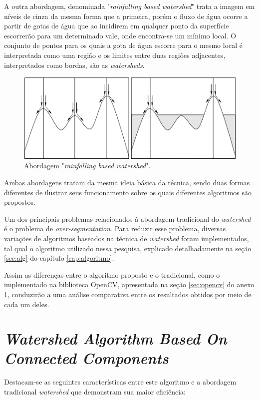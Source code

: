 A outra abordagem, denominada "\textit{rainfalling based watershed}" trata a imagem em níveis de cinza da mesma forma que a primeira, porém o fluxo de água ocorre a partir de gotas de água que ao incidirem em qualquer ponto da superfície escorrerão para um determinado vale, onde encontra-se um mínimo local. O conjunto de pontos para os quais a gota de água escorre para o mesmo local é interpretada como uma região e os limites entre duas regiões adjacentes,  interpretados como bordas, são as \textit{watersheds}. \citep{l6} 

	\begin{figure}[!htb]
       \begin{center}  
          \includegraphics[width=0.6\columnwidth]{img/abordagem_rainfalling.jpg}
           \caption{\label{fig:abordagem_rainfalling}Abordagem "\textit{rainfalling based watershed}". \cite{ruparelia2012implementation}}
       \end{center}
   \end{figure} 
	

Ambas abordagens tratam da mesma ideia básica da técnica, sendo duas formas diferentes de ilustrar seus funcionamento sobre os quais diferentes algoritmos são propostos.

Um dos principais problemas relacionados à abordagem tradicional do \textit{watershed} é o problema de \textit{over-segmentation}. Para reduzir esse problema, diversas variações de algoritmos baseados na técnica de \textit{watershed} foram implementados, tal qual o algoritmo utilizado nessa pesquisa, explicado detalhadamente na seção \ref{sec:alg} do capítulo \ref{cap:algoritmo}. 

Assim as diferenças entre o algoritmo proposto e o tradicional, como o implementado na biblioteca OpenCV, apresentada na seção \ref{sec:opencv} do anexo 1, conduzirão a uma análise comparativa entre os resultados obtidos por meio de cada um deles.

\section{\textit{Watershed Algorithm Based On Connected Components}}
Destacam-se as seguintes características entre este algoritmo e a abordagem tradicional \textit{watershed} que demonstram sua maior eficiência:

